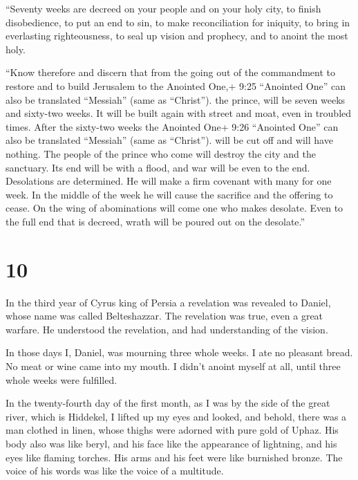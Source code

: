  ``Seventy weeks are decreed on your people and on your
holy city, to finish disobedience, to put an end to sin, to make
reconciliation for iniquity, to bring in everlasting righteousness, to
seal up vision and prophecy, and to anoint the most holy.

 ``Know therefore and discern that from the going out of
the commandment to restore and to build Jerusalem to the Anointed One,+
9:25 ``Anointed One'' can also be translated ``Messiah'' (same as
``Christ''). the prince, will be seven weeks and sixty-two weeks. It
will be built again with street and moat, even in troubled times.
 After the sixty-two weeks the Anointed One+ 9:26
``Anointed One'' can also be translated ``Messiah'' (same as
``Christ''). will be cut off and will have nothing. The people of the
prince who come will destroy the city and the sanctuary. Its end will be
with a flood, and war will be even to the end. Desolations are
determined.  He will make a firm covenant with many for one
week. In the middle of the week he will cause the sacrifice and the
offering to cease. On the wing of abominations will come one who makes
desolate. Even to the full end that is decreed, wrath will be poured out
on the desolate.''

\hypertarget{section-9}{%
\section{10}\label{section-9}}

 In the third year of Cyrus king of Persia a revelation was
revealed to Daniel, whose name was called Belteshazzar. The revelation
was true, even a great warfare. He understood the revelation, and had
understanding of the vision.

 In those days I, Daniel, was mourning three whole weeks.
 I ate no pleasant bread. No meat or wine came into my
mouth. I didn't anoint myself at all, until three whole weeks were
fulfilled.

 In the twenty-fourth day of the first month, as I was by
the side of the great river, which is Hiddekel,  I lifted up
my eyes and looked, and behold, there was a man clothed in linen, whose
thighs were adorned with pure gold of Uphaz.  His body also
was like beryl, and his face like the appearance of lightning, and his
eyes like flaming torches. His arms and his feet were like burnished
bronze. The voice of his words was like the voice of a multitude.

